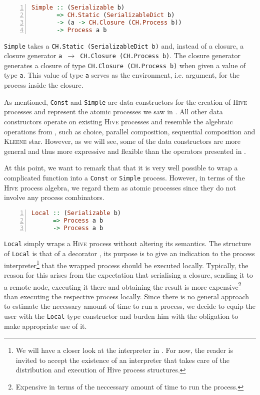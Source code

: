 \begin{lstlisting}[language=Haskell,caption=Signature of the \texttt{Simple} type constructor.,numbers=left,frame=bt]
Simple :: (Serializable b) 
       => CH.Static (SerializableDict b)
       -> (a -> CH.Closure (CH.Process b))
       -> Process a b
\end{lstlisting}
\texttt{Simple} takes a \texttt{CH.Static (SerializableDict b)} and, instead of a closure, a closure generator \texttt{a $\to$ CH.Closure (CH.Process b)}. The closure generator generates a closure of type \texttt{CH.Closure (CH.Process b)} when given a value of type \texttt{a}. This value of type \texttt{a} serves as the environment, i.e. argument, for the process inside the closure.

As mentioned, \texttt{Const} and \texttt{Simple} are data constructors for the creation of \textsc{Hive} processes and represent the atomic processes we saw in . All other data constructors operate on existing \textsc{Hive} processes and resemble the algebraic operations from , such as choice, parallel composition, sequential composition and \textsc{Kleene} star. However, as we will see, some of the data constructors are more general and thus more expressive and flexible than the operators presented in .

At this point, we want to remark that that it is very well possible to wrap a complicated function into a \texttt{Const} or \texttt{Simple} process. However, in terms of the \textsc{Hive} process algebra, we regard them as atomic processes since they do not involve any process combinators.

\begin{lstlisting}[language=Haskell,caption=Signature of the \texttt{Local} type constructor.,numbers=left,frame=bt]
Local :: (Serializable b) 
      => Process a b
      -> Process a b
\end{lstlisting}
\texttt{Local} simply wraps a \textsc{Hive} process without altering its semantics. The structure of \texttt{Local} is that of a decorator \cite{Gamma:1995:DPE:186897}, its purpose is to give an indication to the process interpreter\footnote{We will have a closer look at the interpreter in . For now, the reader is invited to accept the existence of an interpreter that takes care of the distribution and execution of Hive process structures.} that the wrapped process should be executed locally. Typically, the reason for this arises from the expectation that serialising a closure, sending it to a remote node, executing it there and obtaining the result is more expensive\footnote{Expensive in terms of the neccessary amount of time to run the process.} than executing the respective process locally. Since there is no general approach to estimate the necessary amount of time to run a process, we decide to equip the user with the \texttt{Local} type constructor and burden him with the obligation to make appropriate use of it.

